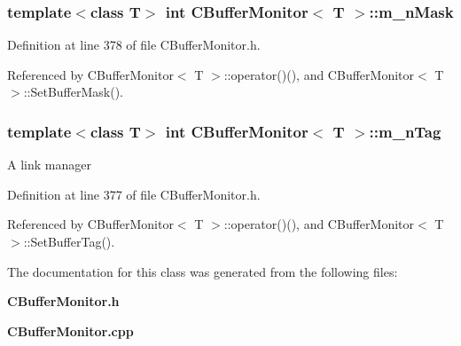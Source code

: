 \subsubsection{\setlength{\rightskip}{0pt plus 5cm}template$<$class T$>$ int CBuffer\-Monitor$<$ T $>$::m\_\-n\-Mask\hspace{0.3cm}{\tt  [private]}}\label{classCBufferMonitor_o4}




Definition at line 378 of file CBuffer\-Monitor.h.

Referenced by CBuffer\-Monitor$<$ T $>$::operator()(), and CBuffer\-Monitor$<$ T $>$::Set\-Buffer\-Mask().
\subsubsection{\setlength{\rightskip}{0pt plus 5cm}template$<$class T$>$ int CBuffer\-Monitor$<$ T $>$::m\_\-n\-Tag\hspace{0.3cm}{\tt  [private]}}\label{classCBufferMonitor_o3}


A link manager 

Definition at line 377 of file CBuffer\-Monitor.h.

Referenced by CBuffer\-Monitor$<$ T $>$::operator()(), and CBuffer\-Monitor$<$ T $>$::Set\-Buffer\-Tag().

The documentation for this class was generated from the following files:\begin{CompactItemize}
\item 
{\bf CBuffer\-Monitor.h}\item 
{\bf CBuffer\-Monitor.cpp}\end{CompactItemize}
